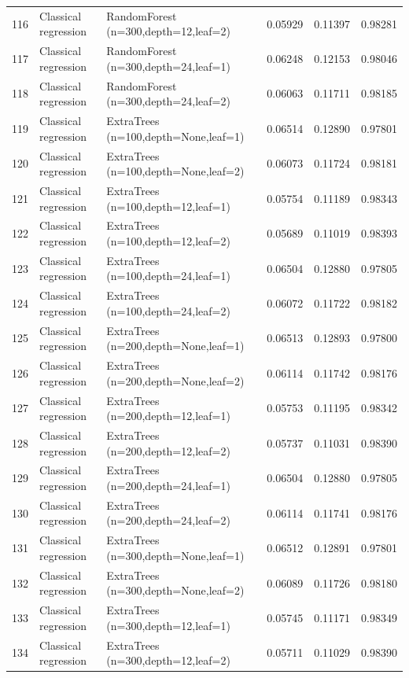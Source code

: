 \documentclass[10pt]{article}
\begin{document}
\begin{longtable}{C{0.75cm}L{2.35cm}L{8.0cm}C{1.15cm}C{1.15cm}C{1.15cm}}
116 & Classical regression & RandomForest (n=300,depth=12,leaf=2) & 0.05929 & 0.11397 & 0.98281 \\
117 & Classical regression & RandomForest (n=300,depth=24,leaf=1) & 0.06248 & 0.12153 & 0.98046 \\
118 & Classical regression & RandomForest (n=300,depth=24,leaf=2) & 0.06063 & 0.11711 & 0.98185 \\
119 & Classical regression & ExtraTrees (n=100,depth=None,leaf=1) & 0.06514 & 0.12890 & 0.97801 \\
120 & Classical regression & ExtraTrees (n=100,depth=None,leaf=2) & 0.06073 & 0.11724 & 0.98181 \\
121 & Classical regression & ExtraTrees (n=100,depth=12,leaf=1) & 0.05754 & 0.11189 & 0.98343 \\
122 & Classical regression & ExtraTrees (n=100,depth=12,leaf=2) & 0.05689 & 0.11019 & 0.98393 \\
123 & Classical regression & ExtraTrees (n=100,depth=24,leaf=1) & 0.06504 & 0.12880 & 0.97805 \\
124 & Classical regression & ExtraTrees (n=100,depth=24,leaf=2) & 0.06072 & 0.11722 & 0.98182 \\
125 & Classical regression & ExtraTrees (n=200,depth=None,leaf=1) & 0.06513 & 0.12893 & 0.97800 \\
126 & Classical regression & ExtraTrees (n=200,depth=None,leaf=2) & 0.06114 & 0.11742 & 0.98176 \\
127 & Classical regression & ExtraTrees (n=200,depth=12,leaf=1) & 0.05753 & 0.11195 & 0.98342 \\
128 & Classical regression & ExtraTrees (n=200,depth=12,leaf=2) & 0.05737 & 0.11031 & 0.98390 \\
129 & Classical regression & ExtraTrees (n=200,depth=24,leaf=1) & 0.06504 & 0.12880 & 0.97805 \\
130 & Classical regression & ExtraTrees (n=200,depth=24,leaf=2) & 0.06114 & 0.11741 & 0.98176 \\
131 & Classical regression & ExtraTrees (n=300,depth=None,leaf=1) & 0.06512 & 0.12891 & 0.97801 \\
132 & Classical regression & ExtraTrees (n=300,depth=None,leaf=2) & 0.06089 & 0.11726 & 0.98180 \\
133 & Classical regression & ExtraTrees (n=300,depth=12,leaf=1) & 0.05745 & 0.11171 & 0.98349 \\
134 & Classical regression & ExtraTrees (n=300,depth=12,leaf=2) & 0.05711 & 0.11029 & 0.98390 \\

\end{longtable}
\end{document}
